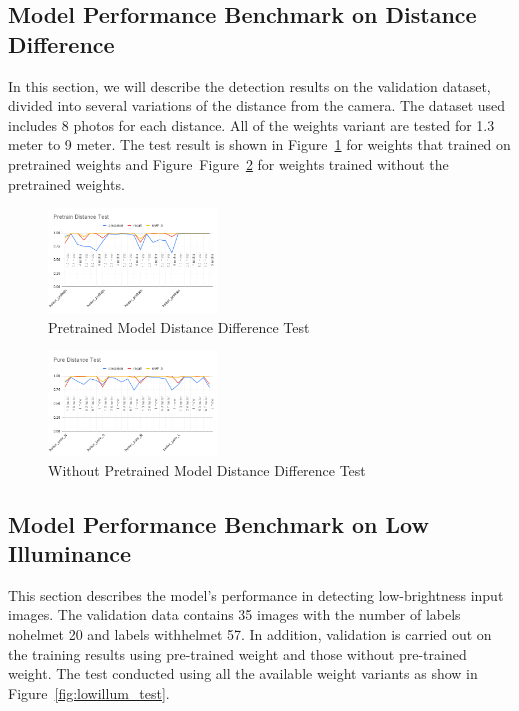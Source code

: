 \subsection{Model Performance Benchmark on Distance Difference}
\label{subsec:model_rangetest}

\par In this section, we will describe the detection results on the validation dataset, divided into several variations of the distance from the camera. The dataset used includes 8 photos for each distance. All of the weights variant are tested for 1.3 meter to 9 meter. The test result is shown in Figure~\ref{fig:pretrain_dist_test} for weights that trained on pretrained weights and Figure~Figure~\ref{fig:pure_dist_test} for weights trained without the pretrained weights.
 
\begin{figure}[ht]
  \centering
  \includegraphics[width=0.4\textwidth]{gambar/utilities/pretain_dist_test.png}
  \caption{Pretrained Model Distance Difference Test}
  \label{fig:pretrain_dist_test}  
\end{figure}

\begin{figure}[ht]
  \centering
  \includegraphics[width=0.4\textwidth]{gambar/utilities/pure_dist_test.png}
  \caption{Without Pretrained Model Distance Difference Test}
  \label{fig:pure_dist_test}  
\end{figure}

\subsection{Model Performance Benchmark on Low Illuminance}
\label{subsec:model_lowillum_test}

\par This section describes the model's performance in detecting low-brightness input images. The validation data contains 35 images with the number of labels no\textunderscore helmet 20 and labels with\textunderscore helmet 57. In addition, validation is carried out on the training results using pre-trained weight and those without pre-trained weight. The test conducted using all the available weight variants as show in Figure~\ref{fig:lowillum_test}.

